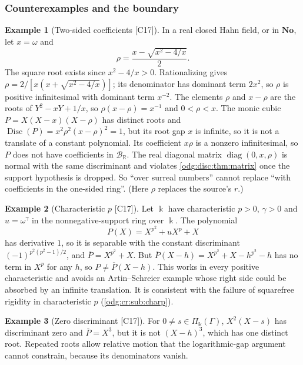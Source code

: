 \documentclass[11pt,oneside]{article}
\numberwithin{equation}{section}
\theoremstyle{definition}
\newtheorem{example}[example]{Example}
\theoremstyle{remark}
\newcommand{\No}{\mathbf{No}}
\newcommand{\R}{\mathbb R}
\newcommand{\BR}{\mathcal B_{\R}}
\newcommand{\src}[1]{\textup{\textsf{\small[#1]}}}
\newcommand{\crP}{\Pi_\Bbbk(\Gamma)}
\newcommand{\Disc}{\operatorname{Disc}}
\begin{document}
\subsubsection{Counterexamples and the boundary}\label{odg:disc:sub:boundaries}

\begin{example}[Two-sided coefficients \src{C17}]\label{odg:disc:ex:twosided}
In a real closed Hahn field, or in $\No$, let $x=\omega$ and
\begin{equation}\label{odg:disc:eq:twosided}
 \rho=\frac{x-\sqrt{x^2-4/x}}2 .
\end{equation}
The square root exists since $x^2-4/x>0$. Rationalizing gives
$\rho=2/[x(x+\sqrt{x^2-4/x})]$; its denominator has dominant term $2x^2$, so
$\rho$ is positive infinitesimal with dominant term $x^{-2}$.
The elements $\rho$ and $x-\rho$ are the roots of
$Y^2-xY+1/x$, so $\rho(x-\rho)=x^{-1}$ and $0<\rho<x$. The monic cubic $P=X(X-x)(X-\rho)$ has
distinct roots and $\Disc(P)=x^2\rho^2(x-\rho)^2=1$, but its root gap $x$ is infinite, so
it is not a translate of a constant polynomial. Its coefficient $x\rho$ is a nonzero
infinitesimal, so $P$ does not have coefficients in $\BR$. The real diagonal matrix
$\operatorname{diag}(0,x,\rho)$ is normal with the same discriminant and violates
\cref{odg:disc:thm:matrix} once the support hypothesis is dropped. So ``over surreal
numbers'' cannot replace ``with coefficients in the one-sided ring''. (Here $\rho$ replaces
the source's $r$.)
\end{example}

\begin{example}[Characteristic $p$ \src{C17}]\label{odg:disc:ex:charp}
Let $\Bbbk$ have characteristic $p>0$, $\gamma>0$ and $u=\omega^\gamma$ in the
nonnegative-support ring over $\Bbbk$. The polynomial
\begin{equation}\label{odg:disc:eq:charp}
 P(X)=X^{p^2}+uX^p+X
\end{equation}
has derivative $1$, so it is separable with the constant discriminant
$(-1)^{p^2(p^2-1)/2}$, and $\overline P=X^{p^2}+X$. But
$\overline P(X-h)=X^{p^2}+X-h^{p^2}-h$ has no term in $X^p$ for any $h$, so
$P\ne\overline P(X-h)$. This works in every positive characteristic and avoids an
Artin--Schreier example whose right side could be absorbed by an infinite translation.
It is consistent with the failure of squarefree rigidity in characteristic $p$
(\cref{odg:cr:sub:charp}).
\end{example}

\begin{example}[Zero discriminant \src{C17}]\label{odg:disc:ex:zero}
For $0\ne s\in\crP$, $X^2(X-s)$ has discriminant zero and $\overline P=X^3$, but it is
not $(X-h)^3$, which has one distinct root. Repeated roots allow relative motion that the
logarithmic-gap argument cannot constrain, because its denominators vanish.
\end{example}
\end{document}
